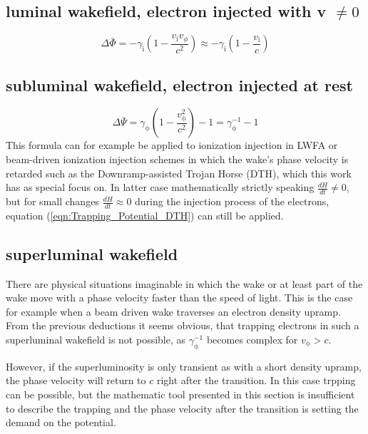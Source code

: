 \subsection*{luminal wakefield, electron injected  with v $\neq 0$}
\begin{equation}
\Delta \bar{\Phi}= -\gamma_\mathrm{i}(1-\frac{v_\mathrm{i}v_\phi}{c^2})\approx -\gamma_\mathrm{i}(1-\frac{v_\mathrm{i}}{c})
\end{equation}
\subsection*{subluminal wakefield, electron injected at rest}

\begin{equation}
\label{eqn:Trapping_Potential_DTH}
\Delta \bar{\Psi}=\gamma_\mathrm{\phi}(1-\frac{v_\mathrm{\phi}^2}{c^2})-1=\gamma_\mathrm{\phi}^{-1}-1
\end{equation}
This formula can for example be applied to ionization injection in LWFA\cite{PakPRL2012} or beam-driven ionization injection schemes in which the wake's phase velocity is retarded such as the Downramp-assisted Trojan Horse (DTH)\cite{DTH}, which this work has as special focus on. In latter case mathematically strictly speaking $\frac{d H}{dt}\neq0 $, but for small changes $\frac{dH}{dt}\approx 0$ during the injection process of the electrons, equation (\ref{eqn:Trapping_Potential_DTH}) can still be applied.

\subsection*{superluminal wakefield}
There are physical situations imaginable in which the wake or at least part of the wake move with a phase velocity faster than the speed of light. This is the case for example when a beam driven wake traverses an electron density upramp.
From the previous deductions it seems obvious, that trapping electrons in such a superluminal wakefield is not possible, as $\gamma_\mathrm{\phi}^{-1}$ becomes complex for $v_\mathrm{\phi}>c$.

However, if the superluminosity is only transient as with a short density upramp, the phase velocity will return to $c$ right after the transition. In this case trpping can be possible, but the mathematic tool presented in this section is insufficient to describe the trapping and the phase velocity after the transition is setting the demand on the potential.
